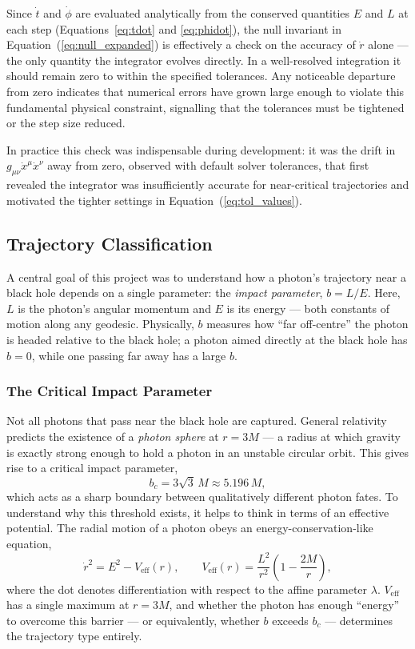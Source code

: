 \documentclass[12pt,a4paper]{article}
\begin{document}
Since $\dot{t}$ and $\dot{\phi}$ are evaluated analytically from the conserved quantities $E$ and $L$ at each step (Equations~\ref{eq:tdot} and \ref{eq:phidot}), the null invariant in Equation~(\ref{eq:null_expanded}) is effectively a check on the accuracy of $\dot{r}$ alone — the only quantity the integrator evolves directly. In a well-resolved integration it should remain zero to within the specified tolerances. Any noticeable departure from zero indicates that numerical errors have grown large enough to violate this fundamental physical constraint, signalling that the tolerances must be tightened or the step size reduced.

In practice this check was indispensable during development: it was the drift in $g_{\mu\nu}\dot{x}^{\mu}\dot{x}^{\nu}$ away from zero, observed with default solver tolerances, that first revealed the integrator was insufficiently accurate for near-critical trajectories and motivated the tighter settings in Equation~(\ref{eq:tol_values}).

\subsection{Trajectory Classification}

A central goal of this project was to understand how a photon's trajectory near a black hole depends on a single parameter: the \textit{impact parameter}, $b = L/E$. Here, $L$ is the photon's angular momentum and $E$ is its energy --- both constants of motion along any geodesic. Physically, $b$ measures how ``far off-centre'' the photon is headed relative to the black hole; a photon aimed directly at the black hole has $b = 0$, while one passing far away has a large $b$.

\subsubsection{The Critical Impact Parameter}
Not all photons that pass near the black hole are captured. General relativity predicts the existence of a \textit{photon sphere} at $r = 3M$ --- a radius at which gravity is exactly strong enough to hold a photon in an unstable circular orbit. This gives rise to a critical impact parameter,
\begin{equation}
    b_c = 3\sqrt{3}\, M \approx 5.196\, M,
    \label{eq:bc}
\end{equation}
which acts as a sharp boundary between qualitatively different photon fates. To understand why this threshold exists, it helps to think in terms of an effective potential. The radial motion of a photon obeys an energy-conservation-like equation,
\begin{equation}
    \dot{r}^2 = E^2 - V_\mathrm{eff}(r), \qquad
    V_\mathrm{eff}(r) = \frac{L^2}{r^2}\left(1 - \frac{2M}{r}\right),
    \label{eq:veff}
\end{equation}
where the dot denotes differentiation with respect to the affine parameter $\lambda$. $V_\mathrm{eff}$ has a single maximum at $r = 3M$, and whether the photon has enough ``energy'' to overcome this barrier --- or equivalently, whether $b$ exceeds $b_c$ --- determines the trajectory type entirely.
\end{document}

